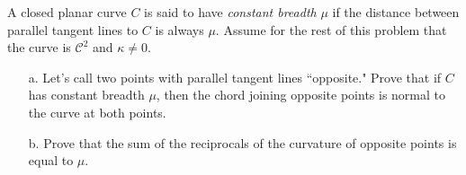 \documentclass[Shifrin_Solutions_Spring_2015]{subfiles}
\begin{document}
\vspace{.5cm}


\begin{exercise}
A closed planar curve $C$ is said to have \emph{constant breadth} $\mu$ if the distance between parallel tangent lines to $C$ is always $\mu$. Assume for the rest of this problem that the curve is $\mathcal{C}^2$ and $\kappa\neq 0$.
\begin{itemize}
\item[a.] Let's call two points with parallel tangent lines ``opposite." Prove that if $C$ has constant breadth $\mu$, then the chord joining opposite points is normal to the curve at both points.
\item[b.] Prove that the sum of the reciprocals of the curvature of opposite points is equal to $\mu$.
\end{itemize}
\end{exercise}
\end{document}

